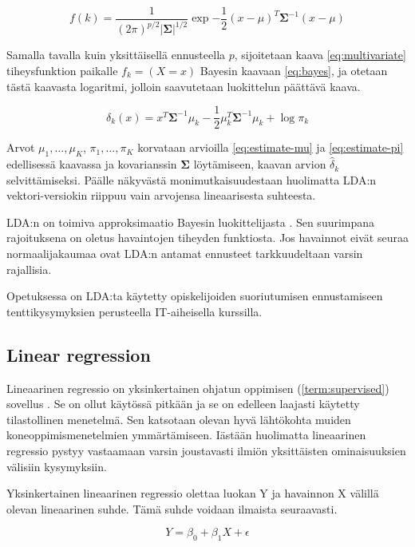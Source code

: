 \documentclass[finnish,twoside,openright]{HYgraduMLDS}
\begin{document}
\begin{equation} \label{eq:multivariate}
    f(k) = \frac{1}{(2\pi)^{p/2} |\pmb{\Sigma}|^{1/2}} \exp{-\frac{1}{2} (x - \mu)^T \pmb{\Sigma}^{-1} (x - \mu)}
\end{equation}

Samalla tavalla kuin yksittäisellä ennusteella $p$, sijoitetaan kaava \ref{eq:multivariate} tiheysfunktion paikalle $f_k = (X = x)$ Bayesin kaavaan \ref{eq:bayes}, ja otetaan tästä kaavasta logaritmi, jolloin saavutetaan luokittelun päättävä kaava.

\begin{equation}
    \delta_k(x) = x^T \pmb{\Sigma}^{-1} \mu_k - \frac{1}{2} \mu_k^T \pmb{\Sigma}^{-1} \mu_k + \log \pi_k
\end{equation}

Arvot $\mu_1, \dots, \mu_K$, $\pi_1, \dots, \pi_K$ korvataan arvioilla \ref{eq:estimate-mu} ja \ref{eq:estimate-pi} edellisessä kaavassa ja kovarianssin $\pmb{\Sigma}$ löytämiseen, kaavan arvion $\hat{\delta}_k$ selvittämiseksi. Päälle näkyvästä monimutkaisuudestaan huolimatta LDA:n vektori-versiokin riippuu vain arvojensa lineaarisesta suhteesta.

LDA:n on toimiva approksimaatio Bayesin luokittelijasta \cite{james2013ISLR}. Sen suurimpana rajoituksena on oletus havaintojen tiheyden funktiosta. Jos havainnot eivät seuraa normaalijakaumaa ovat LDA:n antamat ennusteet tarkkuudeltaan varsin rajallisia.

Opetuksessa on LDA:ta käytetty opiskelijoiden suoriutumisen ennustamiseen tenttikysymyksien perusteella \cite{7265316} IT-aiheisella kurssilla. 


\subsection{Linear regression}

Lineaarinen regressio on yksinkertainen ohjatun oppimisen (\ref{term:supervised}) sovellus \cite{james2013ISLR}. Se on ollut käytössä pitkään ja se on edelleen laajasti käytetty tilastollinen menetelmä. Sen katsotaan olevan hyvä lähtökohta muiden koneoppimismenetelmien ymmärtämiseen. Iästään huolimatta lineaarinen regressio pystyy vastaamaan varsin joustavasti ilmiön yksittäisten ominaisuuksien välisiin kysymyksiin. 

Yksinkertainen lineaarinen regressio olettaa luokan Y ja havainnon X välillä olevan lineaarinen suhde. Tämä suhde voidaan ilmaista seuraavasti. 

\begin{equation} \label{eq:1}
    Y = \beta_0 + \beta_1 X + \epsilon
\end{equation}
\end{document}
